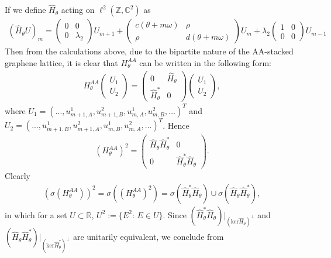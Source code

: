 \documentclass[11pt]{amsart}
\newcommand{\Z}{\mathbb Z}
\newcommand{\R}{\mathbb R}
\newcommand{\C}{\mathbb C}
\begin{document}
If we define $\widehat{H}_{\theta}$ acting on $\ell^2(\Z, \C^2)$ as
\begin{align}
(\widehat{H}_{\theta}U)_m
    =\left(\begin{matrix}
0 &0\\
0 &\lambda_2\end{matrix}\right)
U_{m+1}+
\left(\begin{matrix}
c(\theta+m\omega)&\rho\\
    \rho &d(\theta+m\omega)
\end{matrix}\right)
U_m
+\lambda_2\left(\begin{matrix}
1 &0\\
0 &0\end{matrix}\right)
U_{m-1}
\end{align}
Then from the calculations above, due to the bipartite nature of the AA-stacked graphene lattice, it is clear that $H_{\theta}^{AA}$ can be written in the following form:
\begin{align}\label{eq:HAA=HH}
    H_{\theta}^{AA}
    \left(\begin{matrix}
U_1\\
U_2
\end{matrix}\right)=\left(\begin{matrix} 0 & \widehat{H}_{\theta}\\ \widehat{H}_{\theta}^* &0\end{matrix}\right)    \left(\begin{matrix}
U_1\\
U_2
\end{matrix}\right),
\end{align}
where $U_1=(...,u_{m+1,A}^1, u_{m+1,B}^2, u_{m,A}^1, u_{m,B}^2,...)^T$ and $U_2=(...,u_{m+1,B}^1, u_{m+1,A}^2, u_{m,B}^1, u_{m,A}^2,...)^T$.
Hence
\begin{align}\label{eq:HAA^2=HH}
    (H_{\theta}^{AA})^2= \left(\begin{matrix}
    \widehat{H}_{\theta}\widehat{H}_{\theta}^* &0 \\ 0 &\widehat{H}_{\theta}^*\widehat{H}_{\theta}
    \end{matrix}\right).
\end{align}
Clearly 
\begin{align}
\label{eq:sig_HAA_1}(\sigma(H_{\theta}^{AA}))^2=\sigma((H_{\theta}^{AA})^2)=\sigma(\widehat{H}_{\theta}^*\widehat{H}_{\theta})\cup\sigma(\widehat{H}_{\theta}\widehat{H}_{\theta}^*),
\end{align}
in which for a set $U\subset \R$, $U^2:=\{E^2:\, E\in U\}$.
Since $(\widehat{H}_{\theta}^*\widehat{H}_{\theta})|_{(\mathrm{ker}\widehat{H}_{\theta})^{\perp}}$ and $(\widehat{H}_{\theta}\widehat{H}_{\theta}^*)|_{(\mathrm{ker}\widehat{H}_{\theta}^*)^{\perp}}$ are unitarily equivalent, we conclude from 
\end{document}
